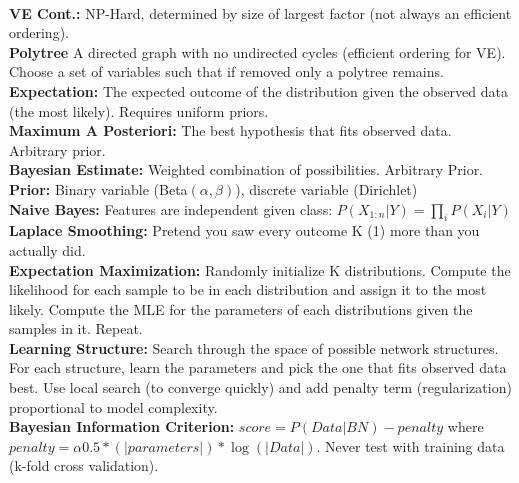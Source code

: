 \documentclass[10pt, a4paper]{article}
\begin{document}
\begin{multicols*}{1}
\begin{tabular}{l|c}
            \end{tabular}\\
            \textbf{VE Cont.:} NP-Hard, determined by size of largest factor (not always an efficient ordering).\\
            \textbf{Polytree} A directed graph with no undirected cycles (efficient ordering for VE). Choose a set of variables such that if removed only a polytree remains.\\
            \textbf{Expectation:} The expected outcome of the distribution given the observed data (the most likely). Requires uniform priors. \\
            \textbf{Maximum A Posteriori:} The best hypothesis that fits observed data. Arbitrary prior.\\
            \textbf{Bayesian Estimate:} Weighted combination of possibilities. Arbitrary Prior.\\
            \textbf{Prior:} Binary variable (Beta$(\alpha, \beta)$), discrete variable (Dirichlet)\\
            \textbf{Naive Bayes:} Features are independent given class: $P(X_{1:n} | Y) = \prod_i P(X_i | Y)$\\
            \textbf{Laplace Smoothing:} Pretend you saw every outcome K (1) more than you actually did.\\
            \textbf{Expectation Maximization:} Randomly initialize K distributions. Compute the likelihood for each sample to be in each distribution and assign it to the most likely. Compute the MLE for the parameters of each distributions given the samples in it. Repeat.\\
            \textbf{Learning Structure:} Search through the space of possible network structures. For each structure, learn the parameters and pick the one that fits observed data best. Use local search (to converge quickly) and add penalty term (regularization) proportional to model complexity.\\
            \textbf{Bayesian Information Criterion:} $score = P(Data | BN) - penalty$ where $penalty =\alpha 0.5 * (|parameters|) * \log (|Data|)$. Never test with training data (k-fold cross validation).
            \newpage

\end{multicols*}
\end{document}
